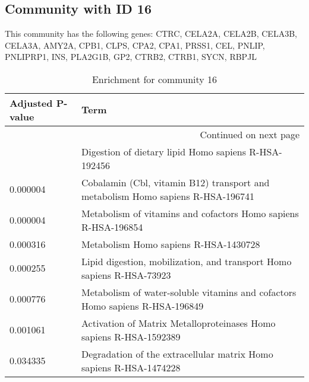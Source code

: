\subsection*{Community with ID 16}
This community has the following genes: CTRC, CELA2A, CELA2B, CELA3B, CELA3A, AMY2A, CPB1, CLPS, CPA2, CPA1, PRSS1, CEL, PNLIP, PNLIPRP1, INS, PLA2G1B, GP2, CTRB2, CTRB1, SYCN, RBPJL
\\
\begin{longtable}{p{2.4cm}p{14.5cm}}
\caption{Enrichment for community 16}\\
\toprule
Adjusted \newline P-value &                                                                             Term \\
\midrule
\endhead
\midrule
\multicolumn{2}{r}{{Continued on next page}} \\
\midrule
\endfoot

\bottomrule
\endlastfoot
                 0.000003 &                             Digestion of dietary lipid Homo sapiens R-HSA-192456 \\
                 0.000004 &  Cobalamin (Cbl, vitamin B12) transport and metabolism Homo sapiens R-HSA-196741 \\
                 0.000004 &                   Metabolism of vitamins and cofactors Homo sapiens R-HSA-196854 \\
                 0.000316 &                                            Metabolism Homo sapiens R-HSA-1430728 \\
                 0.000255 &            Lipid digestion, mobilization, and transport Homo sapiens R-HSA-73923 \\
                 0.000776 &     Metabolism of water-soluble vitamins and cofactors Homo sapiens R-HSA-196849 \\
                 0.001061 &               Activation of Matrix Metalloproteinases Homo sapiens R-HSA-1592389 \\
                 0.034335 &               Degradation of the extracellular matrix Homo sapiens R-HSA-1474228 \\
\end{longtable}


